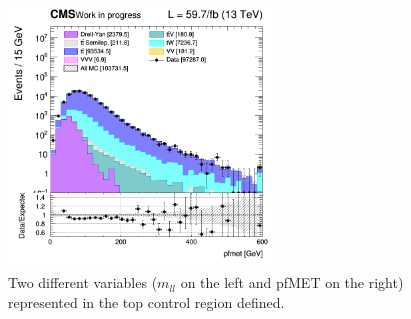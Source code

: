 \documentclass[a4paper, 10pt, openright]{report}
\begin{document}
\begin{figure}[htbp]
{\begin{minipage}[b]{.48\textwidth}
\includegraphics[width=7cm, height=7cm]{figs/2018/log_cratio_ttbarCR_ll_METcorrected_pt.png}
\end{minipage} \hfill
}
\caption{Two different variables ($m_{ll}$ on the left and pf\ac{MET} on the right) represented in the top control region defined.}
\label{fig:TopCR}
\end{figure}
\end{document}
